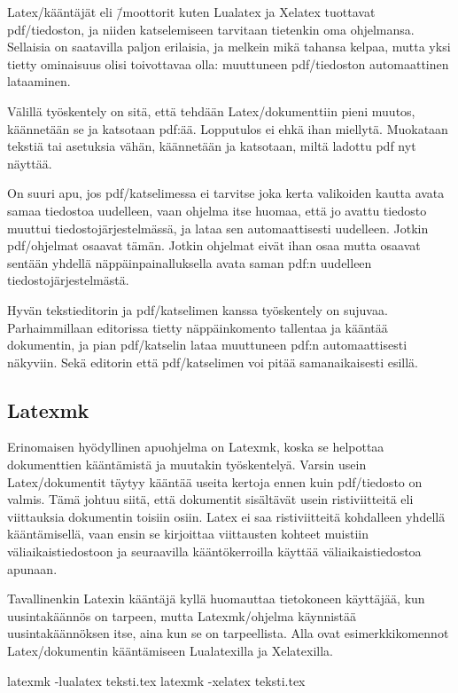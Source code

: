 Latex\-/kääntäjät eli \=/moottorit kuten Lualatex ja Xelatex tuottavat
pdf\-/tiedoston, ja niiden katselemiseen tarvitaan tietenkin oma
ohjelmansa. Sellaisia on saatavilla paljon erilaisia, ja melkein mikä
tahansa kelpaa, mutta yksi tietty ominaisuus olisi toivottavaa olla:
muuttuneen pdf\-/tiedoston automaattinen lataaminen.

Välillä työskentely on sitä, että tehdään Latex\-/dokumenttiin pieni
muutos, käännetään se ja katsotaan pdf:ää. Lopputulos ei ehkä ihan
miellytä. Muokataan tekstiä tai asetuksia vähän, käännetään ja
katsotaan, miltä ladottu pdf nyt näyttää.

On suuri apu, jos pdf\-/katselimessa ei tarvitse joka kerta valikoiden
kautta avata samaa tiedostoa uudelleen, vaan ohjelma itse huomaa, että
jo avattu tiedosto muuttui tiedostojärjestelmässä, ja lataa sen
automaattisesti uudelleen. Jotkin pdf\-/ohjelmat osaavat tämän. Jotkin
ohjelmat eivät ihan osaa mutta osaavat sentään yhdellä
näppäinpainalluksella avata saman pdf:n uudelleen
tiedostojärjestelmästä.

Hyvän tekstieditorin ja pdf\-/katselimen kanssa työskentely on sujuvaa.
Parhaimmillaan editorissa tietty näppäinkomento tallentaa ja kääntää
dokumentin, ja pian pdf\-/katselin lataa muuttuneen pdf:n
automaattisesti näkyviin. Sekä editorin että pdf\-/katselimen voi pitää
sa\-man\-aikai\-ses\-ti esillä.

\subsection{Latexmk}
\label{luku:latexmk}

Erin\-omaisen hyödyllinen apu\-ohjelma on Latexmk, koska se helpottaa
dokumenttien kääntämistä ja muutakin työskentelyä. Varsin usein
Latex\-/dokumentit täytyy kääntää useita kertoja ennen kuin
pdf\-/tiedosto on valmis. Tämä johtuu siitä, että dokumentit sisältävät
usein ristiviitteitä eli viittauksia dokumentin toisiin osiin. Latex ei
saa ristiviitteitä kohdalleen yhdellä kääntämisellä, vaan ensin se
kirjoittaa viittausten kohteet muistiin väliaikaistiedostoon ja
seuraavilla kääntökerroilla käyttää väliaikaistiedostoa apunaan.

Tavallinenkin Latexin kääntäjä kyllä huomauttaa tietokoneen käyttäjää,
kun uusintakäännös on tarpeen, mutta Latexmk\-/ohjelma käynnistää
uusintakäännöksen itse, aina kun se on tarpeellista. Alla ovat
esimerkkikomennot Latex\-/dokumentin kääntämiseen Lualatexilla ja
Xelatexilla.

\begin{koodilohkosis}
  latexmk -lualatex teksti.tex
  latexmk -xelatex  teksti.tex
\end{koodilohkosis}

